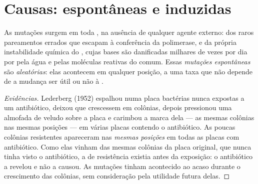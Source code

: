 \section{Causas: espontâneas e induzidas}

\begin{proposition}\label{prop:g11:mutations:spontaneous}
As mutações surgem em toda , na ausência de qualquer agente
externo: dos raros pareamentos errados que escapam à conferência da
polimerase, e da própria instabilidade química do , cujas bases são
danificadas milhares de vezes por dia por  pela água e pelas
moléculas reativas do  comum. Essas
\emph{mutações espontâneas} são \emph{aleatórias}: elas acontecem em
qualquer posição, a uma taxa que não depende de a mudança ser útil ou
não à .
\end{proposition}
\begin{proof}[Evidências]
Lederberg (1952) espalhou numa placa bactérias nunca expostas a um
antibiótico, deixou que crescessem em colônias, depois pressionou uma
almofada de veludo sobre a placa e carimbou a marca dela --- as mesmas
colônias nas mesmas posições --- em várias placas contendo o
antibiótico. As poucas colônias resistentes apareceram nas
\emph{mesmas posições} em todas as placas com antibiótico. Como elas
vinham das mesmas colônias da placa original, que nunca tinha visto o
antibiótico, a  de resistência existia antes da exposição: o
antibiótico a revelou e não a causou. As mutações tinham acontecido ao
acaso durante o crescimento das colônias, sem consideração pela
utilidade futura delas.
\end{proof}

